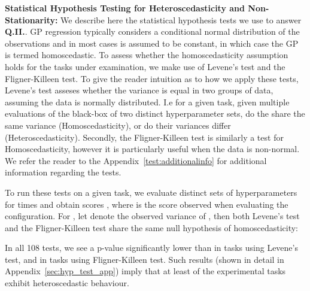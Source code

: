 \documentclass[jair,twoside,11pt,theapa]{article}
\theoremstyle{definition}
\begin{document}
\noindent \textbf{Statistical Hypothesis Testing for Heteroscedasticity and Non-Stationarity:} We describe here the statistical hypothesis tests we use to answer \textbf{Q.II.}. GP regression typically considers a conditional normal distribution of the observations  and in most cases  is assumed to be constant, in which case the GP is termed homoscedastic. To assess whether the homoscedasticity assumption holds for the tasks under examination, we make use of Levene's test and the Fligner-Killeen test. To give the reader intuition as to how we apply these tests, Levene’s test asseses whether the variance is equal in two groups of data, assuming the data is normally distributed. I.e for a given task, given multiple evaluations of the black-box of two distinct hyperparameter sets, do the share the same variance (Homoscedasticity), or do their variances differ (Heteroscedasticity). Secondly, the Fligner-Killeen test is similarly a test for Homoscedasticity, however it is particularly useful when the data is non-normal. We refer the reader to the Appendix~\ref{test:additionalinfo} for additional information regarding the tests. 

To run these tests on a given task, we evaluate  distinct sets of hyperparameters  for  times and obtain scores , where  is the  score observed when evaluating the  configuration. For , let  denote the observed variance of , then both Levene's test and the Fligner-Killeen test share the same null hypothesis of homoscedasticity:



In all 108 tests, we see a p-value significantly lower than  in  tasks using Levene's test, and in  tasks using Fligner-Killeen test. Such results (shown in detail in Appendix~\ref{sec:hyp_test_app}) imply that at least  of the experimental tasks exhibit heteroscedastic behaviour. \\
\end{document}
